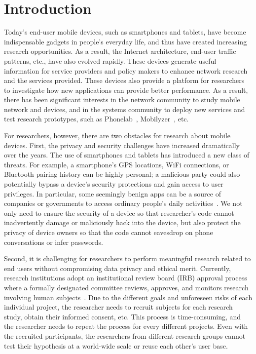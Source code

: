 \section{Introduction}

Today's end-user mobile devices, such as smartphones and
tablets, have become indispensable gadgets in people's everyday
life, and thus have created increasing research opportunities.
As a result, the Internet architecture, end-user traffic
patterns, etc., have also evolved rapidly. These devices
generate useful information for service providers and policy
makers to enhance network research and the services provided.
These devices also provide a platform for researchers to
investigate how new applications can provide better performance.
As a result, there has been significant interests in the network
community to study mobile network and devices, and in the
systems community to deploy new services and test research
prototypes, such as Phonelab~\cite{phonelab, nandugudi2013phonelab}, 
Mobilyzer~\cite{nikravesh2015mobilyzer}, etc.
					
For researchers, however, there are two obstacles for research
about mobile devices. First, the privacy and security challenges
have increased dramatically over the years. The use of 
smartphones and tablets has introduced a new class of threats. 
For example, a smartphone's GPS locations,
WiFi connections, or Bluetooth pairing history can be highly
personal; a malicious party could also potentially bypass a
device's security protections and gain access to user
privileges. In particular, some seemingly benign apps can be a 
source of companies or governments to access ordinary 
people's daily activities~\cite{AngryBirds}. 
We not only need to ensure the security of a device
so that researcher's code cannot inadvertently damage or
maliciously hack into the device, but also protect the privacy
of device owners so that the code cannot eavesdrop on phone
conversations or infer passwords.

Second, it is challenging for researchers to perform meaningful
research related to end users without compromising data privacy
and ethical merit. Currently, research institutions adopt an
institutional review board (IRB) approval process where a
formally designated committee reviews, approves, and monitors
research involving human subjects~\cite{irb}.
Due to the different goals and unforeseen risks of each
individual project, the researcher needs to recruit subjects for
each research study, obtain their informed consent, etc. This
process is time-consuming, and the researcher needs to repeat
the process for every different projects. Even with the
recruited participants, the researchers from different research
groups cannot test their hypothesis at a world-wide scale or
reuse each other's user base.

